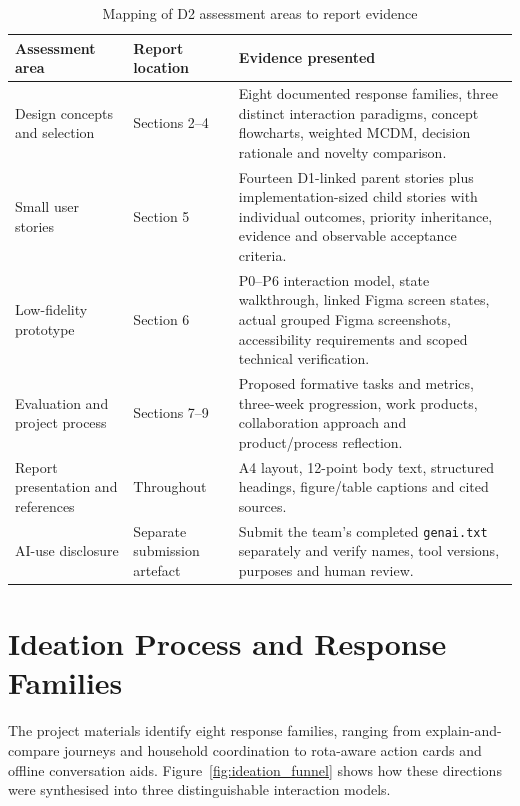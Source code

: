 \documentclass[12pt,a4paper]{article}
\newcommand{\code}[1]{\texttt{#1}}
\begin{document}
\begin{table}[H]
\centering
\small
\caption{Mapping of D2 assessment areas to report evidence}
\label{tab:assessment-map}
\begin{tabularx}{\textwidth}{@{}>{\raggedright\arraybackslash}p{3.1cm}>{\raggedright\arraybackslash}p{2.6cm}X@{}}
\toprule
\textbf{Assessment area} & \textbf{Report location} & \textbf{Evidence presented}\\
\midrule
Design concepts and selection & Sections 2--4 & Eight documented response families, three distinct interaction paradigms, concept flowcharts, weighted MCDM, decision rationale and novelty comparison.\\
\rowcolor{RowGray}
Small user stories & Section 5 & Fourteen D1-linked parent stories plus implementation-sized child stories with individual outcomes, priority inheritance, evidence and observable acceptance criteria.\\
Low-fidelity prototype & Section 6 & P0--P6 interaction model, state walkthrough, linked Figma screen states, actual grouped Figma screenshots, accessibility requirements and scoped technical verification.\\
\rowcolor{RowGray}
Evaluation and project process & Sections 7--9 & Proposed formative tasks and metrics, three-week progression, work products, collaboration approach and product/process reflection.\\
Report presentation and references & Throughout & A4 layout, 12-point body text, structured headings, figure/table captions and cited sources.\\
\rowcolor{RowGray}
AI-use disclosure & Separate submission artefact & Submit the team's completed \code{genai.txt} separately and verify names, tool versions, purposes and human review.\\
\bottomrule
\end{tabularx}
\end{table}

\section{Ideation Process and Response Families}

The project materials identify eight response families, ranging from explain-and-compare journeys and household coordination to rota-aware action cards and offline conversation aids. Figure~\ref{fig:ideation_funnel} shows how these directions were synthesised into three distinguishable interaction models.
\end{document}

